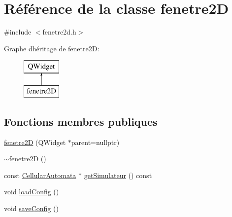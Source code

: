 \hypertarget{classfenetre2_d}{}\section{Référence de la classe fenetre2D}
\label{classfenetre2_d}


{\ttfamily \#include $<$fenetre2d.\+h$>$}

Graphe d\textquotesingle{}héritage de fenetre2D\+:\begin{figure}[H]
\begin{center}
\leavevmode
\includegraphics[height=2.000000cm]{classfenetre2_d}
\end{center}
\end{figure}
\subsection*{Fonctions membres publiques}
\begin{DoxyCompactItemize}
\item 
\mbox{\hyperlink{classfenetre2_d_af1d21292db6ff26d9746374c916039a4}{fenetre2D}} (Q\+Widget $\ast$parent=nullptr)
\item 
\mbox{\hyperlink{classfenetre2_d_a2638afe65581b117673f7133cfbbdc9c}{$\sim$fenetre2D}} ()
\item 
const \mbox{\hyperlink{class_cellular_automata}{Cellular\+Automata}} $\ast$ \mbox{\hyperlink{classfenetre2_d_ab8e5b79b50a28c663bde2e83a202d80c}{get\+Simulateur}} () const
\item 
void \mbox{\hyperlink{classfenetre2_d_a9ee93dcc5e0e7ee3ddcf4bd4bb967162}{load\+Config}} ()
\item 
void \mbox{\hyperlink{classfenetre2_d_a5ac8e27ac8642c78fc40af3afb0a91cd}{save\+Config}} ()
\end{DoxyCompactItemize}
